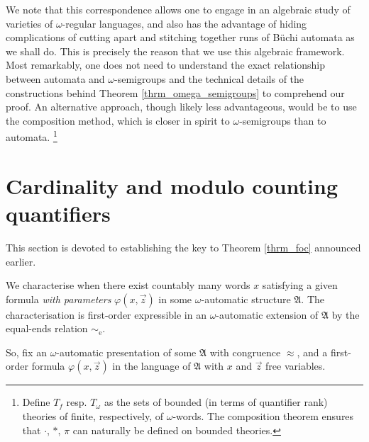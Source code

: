 \documentclass{stacs_proc}
\newcommand{\eqe}{\sim_{\textrm{e}}}
\newcommand{\frakA}{\mathfrak{A}}
\begin{document}
We note that this correspondence allows one to engage 
in an algebraic study of varieties of $\omega$-regular languages,
and also has the advantage of hiding complications of cutting apart and
stitching together runs of B\"uchi automata as we shall do.
This is precisely the reason that we use this algebraic framework.
Most remarkably, one does not need to understand the exact relationship between
automata and $\omega$-semigroups and the technical details of the constructions
behind Theorem \ref{thrm_omega_semigroups} to comprehend our proof.
An alternative approach, though likely less advantageous, would be to use
the composition method, which is closer in spirit to $\omega$-semigroups
than to automata. \footnote{
Define $T_f$ resp. $T_\omega$ as the sets of bounded (in terms of quantifier rank) 
theories of finite, respectively, of $\omega$-words. The composition theorem 
ensures that $\cdot$, $\ast$, $\pi$ can naturally be defined on bounded theories.} 




\vskip-0.3cm
\section{Cardinality and modulo counting quantifiers}

This section is devoted to establishing the key to Theorem \ref{thrm_foc} announced earlier.



We characterise when there exist countably many words $x$ satisfying a given
formula {\em with parameters} $\varphi(x,\vec{z})$ in some $\omega$-automatic
structure $\frakA$.  The characterisation is first-order expressible in an
$\omega$-automatic extension of $\frakA$ by the equal-ends relation $\eqe$. 



So, fix an $\omega$-automatic presentation 
of some $\frakA$ with congruence $\approx$, and a first-order formula
$\varphi(x,\vec{z})$ in the language of $\frakA$ with $x$ and $\vec{z}$ free
variables.
\end{document}
